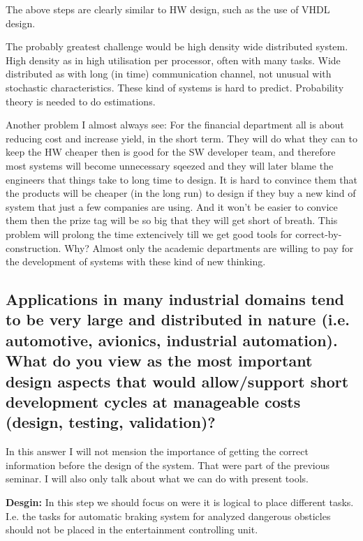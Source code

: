 \documentclass[10pt]{article}
\begin{document}
\medskip

The above steps are clearly similar to HW design, such as the use of VHDL design.

\medskip

The probably greatest challenge would be high density wide distributed system. High density as in high utilisation per processor, often with many tasks. Wide distributed as with long (in time) communication channel, not unusual with stochastic characteristics. These kind of systems is hard to predict. Probability theory is needed to do estimations.

\medskip

Another problem I almost always see: For the financial department all is about reducing cost and increase yield, in the short term. They will do what they can to keep the HW cheaper then is good for the SW developer team, and therefore most systems will become unnecessary sqeezed and they will later blame the engineers that things take to long time to design. It is hard to convince them that the products will be cheaper (in the long run) to design if they buy a new kind of system that just a few companies are using. And it won't be easier to convice them then the prize tag will be so big that they will get short of breath. This problem will prolong the time extencively till we get good tools for correct-by-construction. Why? Almost only the academic departments are willing to pay for the development of systems with these kind of new thinking.

\subsection{Applications in many industrial domains tend to be very large and distributed in nature (i.e. automotive, avionics, industrial automation).
What do you view as the most important design aspects that would allow/support short development cycles at manageable costs (design, testing, validation)?}

In this answer I will not mension the importance of getting the correct information before the design of the system. That were part of the previous seminar. I will also only talk about what we can do with present tools.

\medskip

\textbf{Desgin:}
In this step we should focus on were it is logical to place different tasks. I.e. the tasks for automatic braking system for analyzed dangerous obsticles should not be placed in the entertainment controlling unit.
\end{document}
